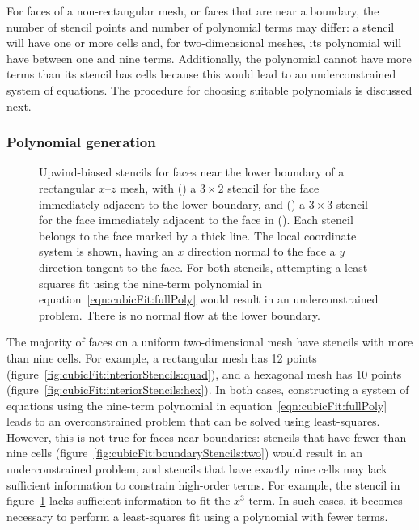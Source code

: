For faces of a non-rectangular mesh, or faces that are near a boundary, the number of stencil points and number of polynomial terms may differ: a stencil will have one or more cells and, for two-dimensional meshes, its polynomial will have between one and nine terms.  Additionally, the polynomial cannot have more terms than its stencil has cells because this would lead to an underconstrained system of equations.  The procedure for choosing suitable polynomials is discussed next.

\subsubsection{Polynomial generation}
\label{sec:cubicFit:polyGen}

\begin{figure}
	\centering
	\begin{subfigure}{\textwidth}
		\centering
		
		\label{fig:cubicFit:boundaryStencils:two}
		\label{fig:cubicFit:boundaryStencils:three}
	\end{subfigure}
	\caption{Upwind-biased stencils for faces near the lower boundary of a rectangular $x$--$z$ mesh, with
	() a $3 \times 2$ stencil for the face immediately adjacent to the lower boundary, and
	() a $3 \times 3$ stencil for the face immediately adjacent to the face in ().  Each stencil belongs to the face marked by a thick line.  The local coordinate system is shown, having an $x$ direction normal to the face a $y$ direction tangent to the face.  For both stencils, attempting a least-squares fit using the nine-term polynomial in equation~\eqref{eqn:cubicFit:fullPoly} would result in an underconstrained problem.
	There is no normal flow at the lower boundary.}
	\label{fig:cubicFit:boundaryStencils}
\end{figure}

The majority of faces on a uniform two-dimensional mesh have stencils with more than nine cells.  For example, a rectangular mesh has 12 points (figure~\ref{fig:cubicFit:interiorStencils:quad}), and a hexagonal mesh has 10 points (figure~\ref{fig:cubicFit:interiorStencils:hex}).
In both cases, constructing a system of equations using the nine-term polynomial in equation~\eqref{eqn:cubicFit:fullPoly} leads to an overconstrained problem that can be solved using least-squares.
However, this is not true for faces near boundaries: stencils that have fewer than nine cells (figure~\ref{fig:cubicFit:boundaryStencils:two}) would result in an underconstrained problem, and stencils that have exactly nine cells may lack sufficient information to constrain high-order terms.
For example, the stencil in figure~\ref{fig:cubicFit:boundaryStencils:three} lacks sufficient information to fit the $x^3$ term.  In such cases, it becomes necessary to perform a least-squares fit using a polynomial with fewer terms.

